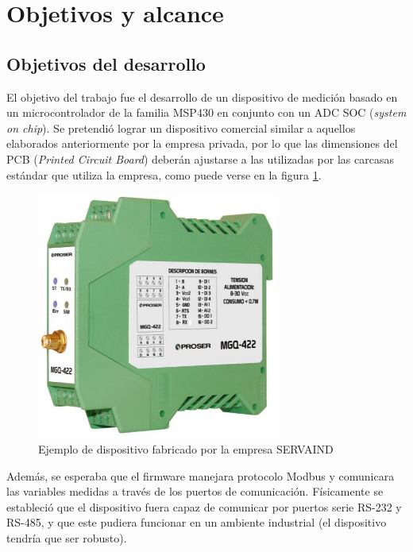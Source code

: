 \section{Objetivos y alcance}

\subsection{Objetivos del desarrollo}

El objetivo del trabajo fue el desarrollo de un dispositivo de medición basado en un microcontrolador de la familia MSP430 en conjunto con un ADC SOC (\textit{system on chip}). Se pretendió lograr un dispositivo comercial similar a aquellos elaborados anteriormente por la empresa privada, por lo que las dimensiones del PCB (\textit{Printed Circuit Board}) deberán ajustarse a las utilizadas por las carcasas estándar que utiliza la empresa, como puede verse en la figura \ref{fig:disp_emp}.

\begin{figure}[!h]
	\centering
	\includegraphics[width=80mm,keepaspectratio]{Figures/dispositivo_empresa.png}
	\caption{Ejemplo de dispositivo fabricado por la empresa SERVAIND\protect\footnotemark}
	\label{fig:disp_emp}
\end{figure}



Además, se esperaba que el firmware manejara protocolo Modbus y comunicara las variables medidas a través de los puertos de comunicación. Físicamente se estableció que el dispositivo fuera capaz de comunicar por puertos serie RS-232 y RS-485, y que este pudiera funcionar en un ambiente industrial (el dispositivo tendría que ser robusto).


